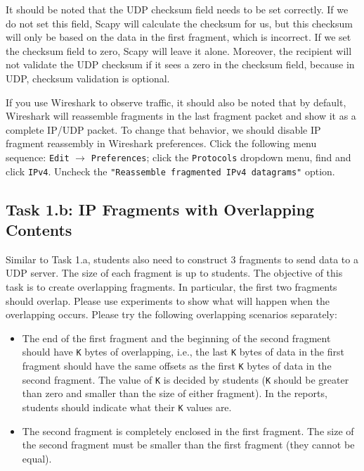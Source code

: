 It should be noted that the UDP checksum field needs to be set 
correctly. If we do not set this field, Scapy will calculate 
the checksum for us, but this checksum will only be based on the 
data in the first fragment, which is incorrect.
If we set the checksum field to  zero, Scapy will leave it alone.
Moreover, the recipient will not validate the UDP checksum 
if it sees a zero in the checksum field, 
because in UDP, checksum validation is optional.


If you use Wireshark to observe traffic, it should also be noted that by default, 
Wireshark will reassemble fragments in the last fragment packet and
show it as a complete IP/UDP packet. To change that behavior,
we should disable IP fragment reassembly in Wireshark preferences.
Click the following menu sequence: \texttt{Edit} $\rightarrow$ \texttt{Preferences}; 
click the \texttt{Protocols} dropdown menu, find and click \texttt{IPv4}.
Uncheck the \texttt{"Reassemble fragmented IPv4 datagrams"} option. 






\subsection{Task 1.b: IP Fragments with Overlapping Contents}

Similar to Task 1.a, students also need to construct 3 fragments to send data to a UDP server.
The size of each fragment is up to students.  The objective of this task is to create
overlapping fragments.  In particular, the first two fragments should overlap.  Please use
experiments to show what will happen when the overlapping occurs. Please
try the following overlapping scenarios separately:
 
 \begin{itemize} 
 \item The end of the first fragment and the beginning of the second
 fragment should have \texttt{K} bytes of overlapping, i.e., the last  
 \texttt{K} bytes of data in the first fragment should have the same
 offsets as the first \texttt{K} bytes of data in the second fragment. 
 The value of \texttt{K} is decided by students (\texttt{K} should be 
 greater than zero and smaller than the size of either fragment). In the reports, students
 should indicate what their \texttt{K} values are. 


 \item The second fragment is completely enclosed in the first fragment.
 The size of the second fragment must be smaller than the 
 first fragment (they cannot be equal).

 \end{itemize} 


